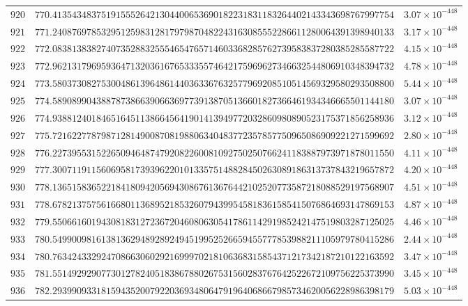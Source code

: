 \documentclass[12pt,reqno]{amsart}
\theoremstyle{remark}
\begin{document}
\begin{longtable}{clc}
$920$ & $770.4135434837519155526421304400653690182231831183264402143343698767997754$ & $3.07\times 10^{-448}$ \\
$921$ & $771.2408769785329512598312817979870482243163085552286611280064391398940133$ & $3.17\times 10^{-448}$ \\
$922$ & $772.0838138382740735288325554654765714603368285762739583837280385285587722$ & $4.15\times 10^{-448}$ \\
$923$ & $772.9621317969593647132036167653335574642175969627346632544806910348394732$ & $4.78\times 10^{-448}$ \\
$924$ & $773.5803730827530048613964861440363367632577969208510514569329580293508800$ & $5.44\times 10^{-448}$ \\
$925$ & $774.5890899043887873866390663697739138705136601827366461934346665501144180$ & $3.07\times 10^{-448}$ \\
$926$ & $774.9388124018465164511386645641901413949772032860980890523175371856258936$ & $3.12\times 10^{-448}$ \\
$927$ & $775.7216227787987128149008708198806340483772357857750965086909221271599692$ & $2.80\times 10^{-448}$ \\
$928$ & $776.2273955315226509464874792082260081092750250766241183887973971878011550$ & $4.11\times 10^{-448}$ \\
$929$ & $777.3007119115606958173939622010133575148828450263089186313737843219657872$ & $4.20\times 10^{-448}$ \\
$930$ & $778.1365158365221841809420569430867613676442102520773587218088529197568907$ & $4.51\times 10^{-448}$ \\
$931$ & $778.6782137575616680113689521853260794399545818361585415076864693147869153$ & $4.87\times 10^{-448}$ \\
$932$ & $779.5506616019430818312723672046080630541786114291985242147519803287125025$ & $4.46\times 10^{-448}$ \\
$933$ & $780.5499009816138136294892892494519952526659455777853988211105979780415286$ & $2.44\times 10^{-448}$ \\
$934$ & $780.7634243329247086630602921699970218106368315854371217342187210122163592$ & $3.47\times 10^{-448}$ \\
$935$ & $781.5514929290773012782405183867880267531560283767642522672109756225373990$ & $3.45\times 10^{-448}$ \\
$936$ & $782.2939909331815943520079220369348064791964068667985734620056228986398179$ & $5.03\times 10^{-448}$ \\

\end{longtable}
\end{document}
